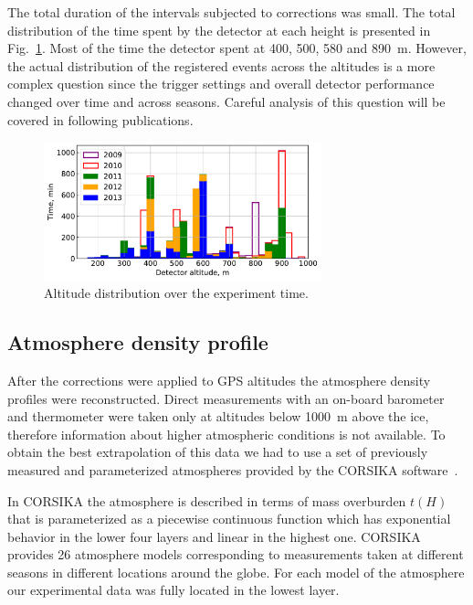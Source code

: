 \documentclass[final,5p,times,twocolumn]{elsarticle}
\begin{document}
The total duration of the intervals subjected to corrections was small. The total distribution of the time spent by the detector at each height is presented in Fig.~\ref{fig:time_on_altitude}. Most of the time the detector spent at 400, 500, 580 and 890~m. However, the actual distribution of the registered events across the altitudes is a more complex question since the trigger settings and overall detector performance changed over time and across seasons. Careful analysis of this question will be covered in following publications.

\begin{figure}[t]
    \includegraphics[width=19pc]{figs/time_on_altitude_c.pdf}%
    \caption{Altitude distribution over the experiment time.}
    \label{fig:time_on_altitude}
\end{figure}


\subsection{Atmosphere density profile}
\label{sect:atmosphere-profile}

After the corrections were applied to GPS altitudes the atmosphere density profiles were reconstructed. Direct measurements with an on-board barometer and thermometer were taken only at altitudes below 1000~m above the ice, therefore information about higher atmospheric conditions is not available. To obtain the best extrapolation of this data we had to use a set of previously measured and parameterized atmospheres provided by the CORSIKA software~\cite{hec98}.

In CORSIKA the atmosphere is described in terms of mass overburden $t(H)$ that is parameterized as a piecewise continuous function which has exponential behavior in the lower four layers and linear in the highest one. %
CORSIKA provides 26 atmosphere models corresponding to measurements taken at different seasons in different locations around the globe. For each model of the atmosphere our experimental data was fully located in the lowest layer.
\end{document}
